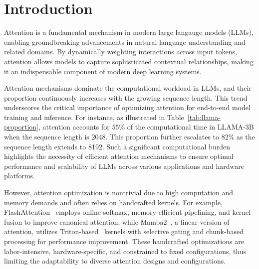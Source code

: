 \section{Introduction}
\label{sec:intro}



Attention is a fundamental mechanism in modern large langauge models (LLMs), enabling groundbreaking advancements in natural language understanding and related domains. By dynamically weighting interactions across input tokens, attention allows models to capture sophisticated contextual relationships, making it an indispensable component of modern deep learning systems.

Attention mechanisms dominate the computational workload in LLMs, and their 
proportion continuously increases with the growing sequence length. This trend underscores the critical importance of optimizing attention for end-to-end model training and inference. 
For instance, as illustrated in Table~\ref{tab:llama-proportion}, attention accounts for \(55\%\) of the computational time in LLAMA-3B when the sequence length is 2048. This proportion further escalates to \(82\%\) as the sequence length extends to 8192. 
Such a significant computational burden highlights the necessity of efficient attention mechanisms to ensure optimal performance and scalability of LLMs across various applications and hardware platforms.

However, attention optimization is nontrivial due to high computation and memory demands and often relies on handcrafted kernels. For example, FlashAttention~\cite{dao2022flashattention} employs online softmax, memory-efficient pipelining, and kernel fusion to improve canonical attention; while Mamba2~\cite{dao2024mamba2}, a linear version of attention, utilizes Triton-based~\cite{triton} kernels with selective gating and chunk-based processing for performance improvement. These handcrafted optimizations are labor-intensive, hardware-specific, and constrained to fixed configurations, thus limiting the adaptability to diverse attention designs and configurations.


